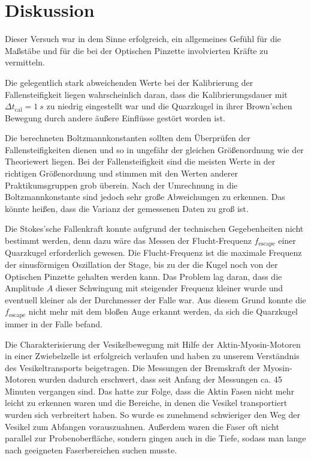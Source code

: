 \newpage
\section{Diskussion}
\label{sec:discussion}
Dieser Versuch war in dem Sinne erfolgreich, ein allgemeines Gefühl für die Maßstäbe und für die bei der Optischen Pinzette involvierten Kräfte zu vermitteln.

Die gelegentlich stark abweichenden Werte bei der Kalibrierung der Fallensteifigkeit liegen wahrscheinlich daran, dass die Kalibrierungsdauer mit $\Delta t_{\mathrm{cal}} = \qty{1}{s}$ zu niedrig eingestellt war und die Quarzkugel in ihrer Brown'schen Bewegung durch andere äußere Einflüsse gestört worden ist.

Die berechneten Boltzmannkonstanten sollten dem Überprüfen der Fallensteifigkeiten dienen und so in ungefähr der gleichen Größenordnung wie der Theoriewert liegen.
Bei der Fallensteifigkeit sind die meisten Werte in der richtigen Größenordnung und stimmen mit den Werten anderer Praktikumsgruppen grob überein.
Nach der Umrechnung in die Boltzmannkonstante sind jedoch sehr große Abweichungen zu erkennen.
Das könnte heißen, dass die Varianz der gemessenen Daten zu groß ist.

Die Stokes'sche Fallenkraft konnte aufgrund der technischen Gegebenheiten nicht bestimmt werden, denn dazu wäre das Messen der Flucht-Frequenz $f_{\mathrm{escape}}$ einer Quarzkugel erforderlich gewesen.
Die Flucht-Frequenz ist die maximale Frequenz der sinusförmigen Oszillation der Stage, bis zu der die Kugel noch von der Optischen Pinzette gehalten werden kann.
Das Problem lag daran, dass die Amplitude $A$ dieser Schwingung mit steigender Frequenz kleiner wurde und eventuell kleiner als der Durchmesser der Falle war.
Aus diesem Grund konnte die $f_{\mathrm{escape}}$ nicht mehr mit dem bloßen Auge erkannt werden, da sich die Quarzkugel immer in der Falle befand.

Die Charakterisierung der Vesikelbewegung mit Hilfe der Aktin-Myosin-Motoren in einer Zwiebelzelle ist erfolgreich verlaufen und haben zu unserem Verständnis des Vesikeltransports beigetragen.
Die Messungen der Bremskraft der Myosin-Motoren wurden dadurch erschwert, dass seit Anfang der Messungen ca. 45 Minuten vergangen sind.
Das hatte zur Folge, dass die Aktin Fasen nicht mehr leicht zu erkennen waren und die Bereiche, in denen die Vesikel transportiert wurden sich verbreitert haben.
So wurde es zunehmend schwieriger den Weg der Vesikel zum Abfangen vorauszuahnen.
Außerdem waren die Faser oft nicht parallel zur Probenoberfläche, sondern gingen auch in die Tiefe, sodass man lange nach geeigneten Faserbereichen suchen musste.
